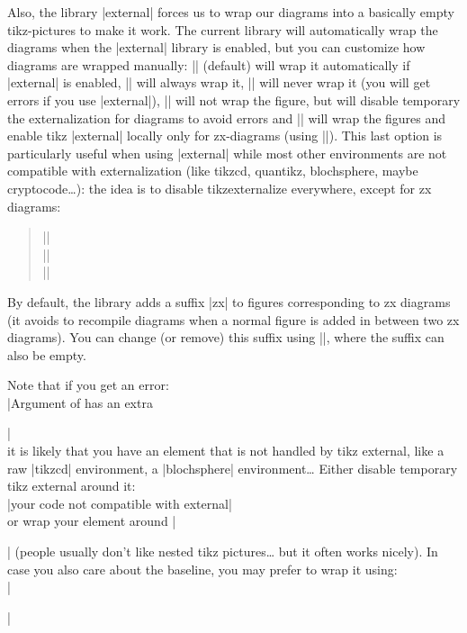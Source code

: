 \documentclass[a4paper,doc2]{ltxdoc} %
\begin{document}
{\begin{pgfmanualentry}
  \extractcommand\zxExternalAuto\@@
  \extractcommand\zxExternalWrap\@@
  \extractcommand\zxExternalNoWrap\@@
  \extractcommand\zxExternalNoWrapNoExt\@@
  \extractcommand\zxExternalWrapForceExt\@@
  \pgfmanualbody
  Also, the library |external| forces us to wrap our diagrams into a basically empty tikz-pictures to make it work. The current library will automatically wrap the diagrams when the |external| library is enabled, but you can customize how diagrams are wrapped manually: |\zxExternalAuto| (default) will wrap it automatically if |external| is enabled, |\zxExternalWrap| will always wrap it, |\zxExternalNoWrap| will never wrap it (you will get errors if you use |external|), |\zxExternalNoWrapNoExt| will not wrap the figure, but will disable temporary the externalization for diagrams to avoid errors and |\zxExternalWrapForceExt| will wrap the figures and enable tikz |external| locally only for zx-diagrams (using |\tikzexternalenable|). This last option is particularly useful when using |external| while most other environments are not compatible with externalization (like tikzcd, quantikz, blochsphere, maybe cryptocode\dots{}): the idea is to disable tikzexternalize everywhere, except for zx diagrams:
\begin{verse}
|\tikzexternalize|\\
|\tikzexternaldisable|\\
|\zxExternalWrapForceExt|
\end{verse}
\end{pgfmanualentry}

\begin{pgfmanualentry}
  \extractcommand\zxExternalSuffix{}\@@
  \pgfmanualbody
By default, the library adds a suffix |zx| to figures corresponding to zx diagrams (it avoids to recompile diagrams when a normal figure is added in between two zx diagrams). You can change (or remove) this suffix using ||, where the suffix can also be empty.
\end{pgfmanualentry}

Note that if you get an error:\\
|Argument of \tikzexternal@laTeX@collect@until@end@tikzpicture has an extra }|\\
it is likely that you have an element that is not handled by tikz external, like a raw |tikzcd| environment, a |blochsphere| environment\dots{} Either disable temporary tikz external around it:\\
|{\tikzexternaldisable your code not compatible with external}|\\
or wrap your element around || (people usually don't like nested tikz pictures\dots{} but it often works nicely). In case you also care about the baseline, you may prefer to wrap it using:\\
||
\end{document}
